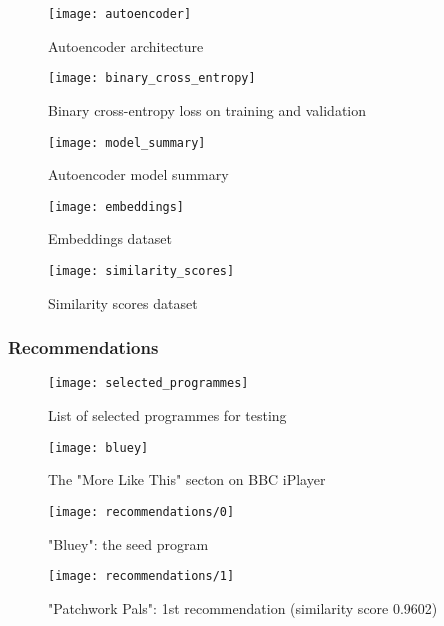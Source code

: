 \begin{figure}[h]
  \centering
  \texttt{[image: autoencoder]}
  \caption{Autoencoder architecture}
  \label{fig:autoencoder}
\end{figure}

\begin{figure}[h]
  \centering
  \texttt{[image: binary\_cross\_entropy]}
  \caption{Binary cross-entropy loss on training and validation}
  \label{fig:binary_cross_entropy}
\end{figure}

\begin{figure}[h]
  \centering
  \texttt{[image: model\_summary]}
  \caption{Autoencoder model summary}
  \label{fig:model_summary}
\end{figure}

\begin{figure}[h]
  \centering
  \texttt{[image: embeddings]}
  \caption{Embeddings dataset}
  \label{fig:embeddings}
\end{figure}

\begin{figure}[h]
  \centering
  \texttt{[image: similarity\_scores]}
  \caption{Similarity scores dataset}
  \label{fig:similarity_scores}
\end{figure}

\subsubsection{Recommendations}

\begin{figure}[h]
  \centering
  \texttt{[image: selected\_programmes]}
  \caption{List of selected programmes for testing}
  \label{fig:selected_programmes}
\end{figure}

\begin{figure}[h]
  \centering
  \texttt{[image: bluey]}
  \caption{The "More Like This" secton on BBC iPlayer}
  \label{fig:bluey}
\end{figure}

\begin{figure}[h]
  \centering
  \texttt{[image: recommendations/0]}
  \caption{"Bluey": the seed program}
  \label{fig:recommendations:0}
\end{figure}

\begin{figure}[h]
  \centering
  \texttt{[image: recommendations/1]}
  \caption{"Patchwork Pals": 1st recommendation (similarity score 0.9602)}
  \label{fig:recommendations:1}
\end{figure}

